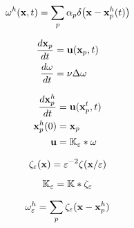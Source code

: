 \begin{equation}
  \label{eq:point-vortex-method-approximation}
  \omega^h(\mathbf x, t) = \sum_p\alpha_p\delta\bigl(\mathbf x - \mathbf x_p^h(t)\bigr)
\end{equation}

\begin{align}
  \frac{d\mathbf x_p}{dt} &= \mathbf u(\mathbf x_p, t) \\
  \frac{d\omega}{dt} &= \nu\Delta\omega
\end{align}




\begin{align}
  \label{eq:vortex-blob-ode}
  \frac{d\mathbf x_p^h}{dt} &= \mathbf u(\mathbf x_p^t, t) \\
  \mathbf x_p^h(0) &= \mathbf x_p \\
  \mathbf u &= \mathbb{K}_\varepsilon * \omega
\end{align}

\begin{equation}
  \zeta_\varepsilon(\mathbf x) = \varepsilon^{-2}\zeta(\mathbf x/\varepsilon)
\end{equation}

\begin{equation}
  \mathbb{K}_\varepsilon = \mathbb{K} * \zeta_\varepsilon
\end{equation}

\begin{equation}
  \omega_\varepsilon^h = \sum_p\zeta_\varepsilon(\mathbf x - \mathbf x_p^h)
\end{equation}

